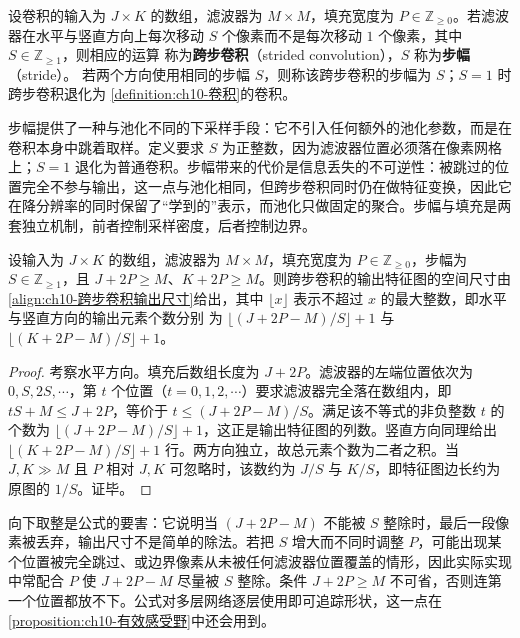 \documentclass[../../main.tex]{subfiles}
\begin{document}
\begin{definition}[跨步卷积与步幅]\label{definition:ch10-跨步卷积}
设卷积的输入为 $J\times K$ 的数组，滤波器为 $M\times M$，填充宽度为
$P\in\mathbb{Z}_{\geqslant0}$。若滤波器在水平与竖直方向上每次移动
$S$ 个像素而不是每次移动 $1$ 个像素，其中 $S\in\mathbb{Z}_{\geqslant1}$，则相应的运算
称为\textbf{跨步卷积}（strided convolution），$S$ 称为\textbf{步幅}（stride）。
若两个方向使用相同的步幅 $S$，则称该跨步卷积的步幅为 $S$；$S=1$ 时跨步卷积退化为
\cref{definition:ch10-卷积}的卷积。
\end{definition}

\begin{remark}
步幅提供了一种与池化不同的下采样手段：它不引入任何额外的池化参数，而是在卷积本身中跳着取样。定义要求 $S$ 为正整数，因为滤波器位置必须落在像素网格上；$S=1$ 退化为普通卷积。步幅带来的代价是信息丢失的不可逆性：被跳过的位置完全不参与输出，这一点与池化相同，但跨步卷积同时仍在做特征变换，因此它在降分辨率的同时保留了“学到的”表示，而池化只做固定的聚合。步幅与填充是两套独立机制，前者控制采样密度，后者控制边界。
\end{remark}

\begin{proposition}[跨步卷积的输出尺寸]\label{proposition:ch10-跨步卷积输出尺寸}
设输入为 $J\times K$ 的数组，滤波器为 $M\times M$，填充宽度为
$P\in\mathbb{Z}_{\geqslant0}$，步幅为 $S\in\mathbb{Z}_{\geqslant1}$，且
$J+2P\geqslant M$、$K+2P\geqslant M$。则跨步卷积的输出特征图的空间尺寸由\eqref{align:ch10-跨步卷积输出尺寸}给出，其中
$\lfloor x\rfloor$ 表示不超过 $x$ 的最大整数，即水平与竖直方向的输出元素个数分别
为 $\lfloor (J+2P-M)/S\rfloor+1$ 与 $\lfloor (K+2P-M)/S\rfloor+1$。
\end{proposition}
\begin{proof}
考察水平方向。填充后数组长度为 $J+2P$。滤波器的左端位置依次为 $0,S,2S,\cdots$，第 $t$ 个位置（$t=0,1,2,\cdots$）要求滤波器完全落在数组内，即 $tS+M\leqslant J+2P$，等价于 $t\leqslant (J+2P-M)/S$。满足该不等式的非负整数 $t$ 的个数为 $\lfloor (J+2P-M)/S\rfloor+1$，这正是输出特征图的列数。竖直方向同理给出 $\lfloor (K+2P-M)/S\rfloor+1$ 行。两方向独立，故总元素个数为二者之积。当 $J,K\gg M$ 且 $P$ 相对 $J,K$ 可忽略时，该数约为 $J/S$ 与 $K/S$，即特征图边长约为原图的 $1/S$。证毕。
\end{proof}

\begin{remark}
向下取整是公式的要害：它说明当 $(J+2P-M)$ 不能被 $S$ 整除时，最后一段像素被丢弃，输出尺寸不是简单的除法。若把 $S$ 增大而不同时调整 $P$，可能出现某个位置被完全跳过、或边界像素从未被任何滤波器位置覆盖的情形，因此实际实现中常配合 $P$ 使 $J+2P-M$ 尽量被 $S$ 整除。条件 $J+2P\geqslant M$ 不可省，否则连第一个位置都放不下。公式对多层网络逐层使用即可追踪形状，这一点在\cref{proposition:ch10-有效感受野}中还会用到。
\end{remark}
\end{document}
